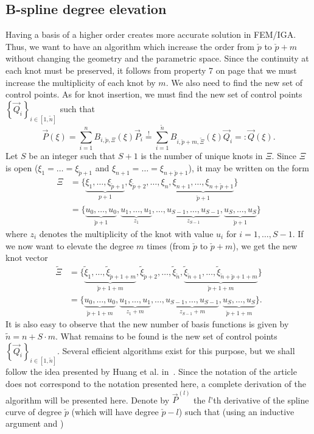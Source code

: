 \subsection{B-spline degree elevation}
Having a basis of a higher order creates more accurate solution in FEM/IGA. Thus, we want to have an algorithm which increase the order from $\check{p}$ to $\check{p}+m$ without changing the geometry and the parametric space. Since the continuity at each knot must be preserved, it follows from property 7 on page \pageref{List:properties} that we must increase the multiplicity of each knot by $m$. We also need to find the new set of control points. As for knot insertion, we must find the new set of control points $\left\{\vec{Q}_i\right\}_{i\in[1,\tilde{n}]}$ such that
\begin{equation*}
	\vec{P}(\xi) = \sum_{i=1}^n B_{i,\check{p},\Xi}(\xi) \vec{P}_i \overset{!}{=} \sum_{i=1}^{\tilde{n}} B_{i,\check{p}+m,\tilde{\Xi}}(\xi) \vec{Q}_i =: \vec{Q}(\xi).
\end{equation*}
Let $S$ be an integer such that $S+1$ is the number of unique knots in $\Xi$. Since $\Xi$ is open ($\xi_1=\dots=\xi_{\check{p}+1}$ and $\xi_{n+1}=\dots=\xi_{n+\check{p}+1}$), it may be written on the form
\begin{align*}
	\Xi &= \{\underbrace{\xi_1,\dots,\xi_{\check{p}+1}}_{p+1}, \xi_{\check{p}+2},\dots,\xi_n,\underbrace{\xi_{n+1},\dots,\xi_{n+\check{p}+1}}_{\check{p}+1}\}\\
		&= \{\underbrace{u_0,\dots,u_0}_{\check{p}+1},\underbrace{u_1,\dots,u_1}_{z_1},\dots,\underbrace{u_{S-1},\dots,u_{S-1}}_{z_{S-1}},\underbrace{u_S,\dots,u_S}_{\check{p}+1}\}
\end{align*}
where $z_i$ denotes the multiplicity of the knot with value $u_i$ for $i=1,\dots,S-1$. If we now want to elevate the degree $m$ times (from $\check{p}$ to $\check{p}+m$), we get the new knot vector
\begin{align*}
	\tilde{\Xi} &= \{\underbrace{\tilde{\xi}_1,\dots,\tilde{\xi}_{\check{p}+1+m}}_{\check{p}+1+m}, \tilde{\xi}_{\check{p}+2},\dots,\tilde{\xi}_{\tilde{n}},\underbrace{\tilde{\xi}_{\tilde{n}+1},\dots,\tilde{\xi}_{\tilde{n}+\check{p}+1+m}}_{\check{p}+1+m}\}\\
	&= \{\underbrace{u_0,\dots,u_0}_{\check{p}+1+m},\underbrace{u_1,\dots,u_1}_{z_1+m},\dots,\underbrace{u_{S-1},\dots,u_{S-1}}_{z_{S-1}+m},\underbrace{u_S,\dots,u_S}_{\check{p}+1+m}\}.
\end{align*}
It is also easy to observe that the new number of basis functions is given by $\tilde{n}=n+S\cdot m$. What remains to be found is the new set of control points $\left\{\vec{Q}_i\right\}_{i\in[1,\tilde{n}]}$. Several efficient algorithms exist for this purpose, but we shall follow the idea presented by Huang et al. in~\cite{Huang2004ede}. Since the notation of the article does not correspond to the notation presented here, a complete derivation of the algorithm will be presented here. Denote by $\vec{P}^{(l)}$ the $l$'th derivative of the spline curve of degree $\check{p}$ (which will have degree $\check{p}-l$) such that (using an inductive argument and )
